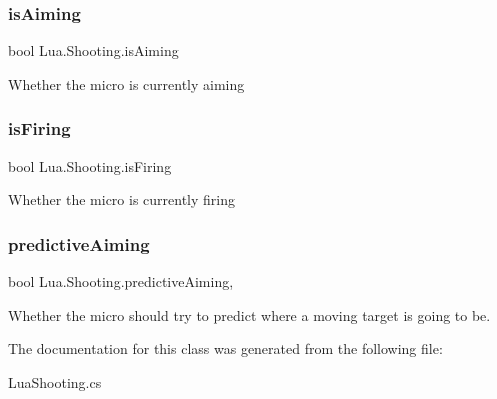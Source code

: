 \mbox{\label{class_lua_1_1_shooting_a0c512eac7dea63f8594bbfcb0976a34a}} 
\subsubsection{\texorpdfstring{isAiming}{isAiming}}
{\footnotesize\ttfamily bool Lua.\+Shooting.\+is\+Aiming\hspace{0.3cm}{\ttfamily [get]}}



Whether the micro is currently aiming 

\mbox{\label{class_lua_1_1_shooting_a0b4d9622c4a1888f424ebdc13db498d1}} 
\subsubsection{\texorpdfstring{isFiring}{isFiring}}
{\footnotesize\ttfamily bool Lua.\+Shooting.\+is\+Firing\hspace{0.3cm}{\ttfamily [get]}}



Whether the micro is currently firing 

\mbox{\label{class_lua_1_1_shooting_adc410fd560cfdc7bdbd5b870a7adedbf}} 
\subsubsection{\texorpdfstring{predictiveAiming}{predictiveAiming}}
{\footnotesize\ttfamily bool Lua.\+Shooting.\+predictive\+Aiming\hspace{0.3cm}{\ttfamily [get]}, {\ttfamily [set]}}



Whether the micro should try to predict where a moving target is going to be. 



The documentation for this class was generated from the following file\+:\begin{DoxyCompactItemize}
\item 
Lua\+Shooting.\+cs\end{DoxyCompactItemize}
